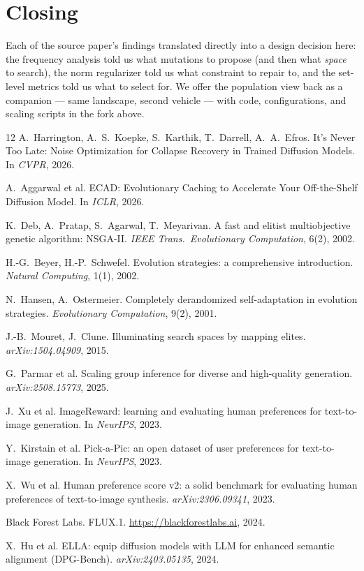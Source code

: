 \documentclass[10pt,twocolumn,letterpaper]{article}
\begin{document}
\section{Closing}
Each of the source paper's findings translated directly into a design
decision here: the frequency analysis told us what mutations to propose (and
then what \emph{space} to search), the norm regularizer told us what
constraint to repair to, and the set-level metrics told us what to select
for. We offer the population view back as a companion --- same landscape,
second vehicle --- with code, configurations, and scaling scripts in the fork
above.

{\small
\begin{thebibliography}{12}
A.~Harrington, A.~S.~Koepke, S.~Karthik, T.~Darrell, A.~A.~Efros.
\newblock It's Never Too Late: Noise Optimization for Collapse Recovery in
Trained Diffusion Models.
\newblock In \emph{CVPR}, 2026.

A.~Aggarwal et al.
\newblock ECAD: Evolutionary Caching to Accelerate Your Off-the-Shelf
Diffusion Model.
\newblock In \emph{ICLR}, 2026.

K.~Deb, A.~Pratap, S.~Agarwal, T.~Meyarivan.
\newblock A fast and elitist multiobjective genetic algorithm: NSGA-II.
\newblock \emph{IEEE Trans.\ Evolutionary Computation}, 6(2), 2002.

H.-G.~Beyer, H.-P.~Schwefel.
\newblock Evolution strategies: a comprehensive introduction.
\newblock \emph{Natural Computing}, 1(1), 2002.

N.~Hansen, A.~Ostermeier.
\newblock Completely derandomized self-adaptation in evolution strategies.
\newblock \emph{Evolutionary Computation}, 9(2), 2001.

J.-B.~Mouret, J.~Clune.
\newblock Illuminating search spaces by mapping elites.
\newblock \emph{arXiv:1504.04909}, 2015.

G.~Parmar et al.
\newblock Scaling group inference for diverse and high-quality generation.
\newblock \emph{arXiv:2508.15773}, 2025.

J.~Xu et al.
\newblock ImageReward: learning and evaluating human preferences for
text-to-image generation.
\newblock In \emph{NeurIPS}, 2023.

Y.~Kirstain et al.
\newblock Pick-a-Pic: an open dataset of user preferences for text-to-image
generation.
\newblock In \emph{NeurIPS}, 2023.

X.~Wu et al.
\newblock Human preference score v2: a solid benchmark for evaluating human
preferences of text-to-image synthesis.
\newblock \emph{arXiv:2306.09341}, 2023.

Black Forest Labs.
\newblock FLUX.1.
\newblock \url{https://blackforestlabs.ai}, 2024.

X.~Hu et al.
\newblock ELLA: equip diffusion models with LLM for enhanced semantic
alignment (DPG-Bench).
\newblock \emph{arXiv:2403.05135}, 2024.
\end{thebibliography}
}
\end{document}
